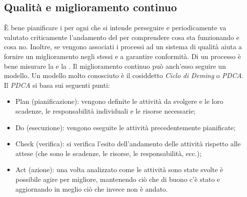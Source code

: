 \documentclass[../main]{subfiles}
\begin{document}
\subsection{Qualità e miglioramento continuo}
È bene pianificare i  per ogni  che si intende perseguire e periodicamente va valutato criticamente l'andamento del  per comprendere cosa sta funzionando e cosa no.
Inoltre, se vengono associati i processi ad un sistema di qualità aiuta a fornire un miglioramento negli stessi e a garantire conformità. Di un processo è bene misurare la  e la .
Il miglioramento continuo può anch'esso seguire un modello. Un modello molto conosciuto è il cosiddetto \textit{Ciclo di Deming} o \textit{PDCA}.
Il \textit{PDCA} si basa sui seguenti punti:
\begin{itemize}
    \item Plan (pianificazione): vengono definite le attività da svolgere e le loro scadenze, le responsabilità individuali e le risorse necessarie;
    \item Do (esecuzione): vengono eseguite le attività precedentemente pianificate;
    \item Check (verifica): si verifica l'esito dell'andamento delle attività rispetto alle attese (che sono le scadenze, le risorse, le responsabilità, ecc.);
    \item Act (azione): una volta analizzato come le attività sono state svolte è possibile agire per migliore, mantenendo ciò che di buono c'è stato e aggiornando in meglio ciò che invece non è andato.
\end{itemize}
\end{document}

